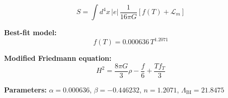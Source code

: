 
\begin{equation}
  S = \int d^4x \, |e| \, \frac{1}{16\pi G} \left[ f(T) + \mathcal{L}_m \right]
\end{equation}

\textbf{Best-fit model:}
\begin{equation}
  f(T) = 0.000636 \, T^{1.2071}
\end{equation}

\textbf{Modified Friedmann equation:}
\begin{equation}
  H^2 = \frac{8\pi G}{3} \rho - \frac{f}{6} + \frac{T f_T}{3}
\end{equation}

\textbf{Parameters:}
$\alpha = 0.000636$, \quad
$\beta = -0.446232$, \quad
$n = 1.2071$, \quad
$\Lambda_{\text{BI}} = 21.8475$